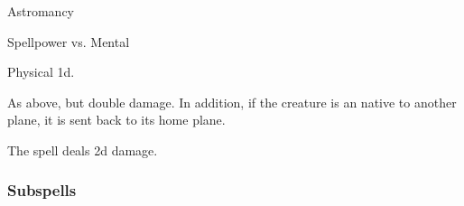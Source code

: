 \newpage
\begin{spellsection}{Astromancy}

\begin{spellheader}
\end{spellheader}

\begin{spellcontent}

\begin{spelltargetinginfo}




\end{spelltargetinginfo}


\begin{spelleffects}




\begin{spellattack}{Spellpower vs. Mental}


\spellsuccess Physical  \plus1d.


\spellcritical
As above, but double damage.
In addition, if the creature is an  native to another plane, it is sent back to its home plane.



\end{spellattack}





\end{spelleffects}

\end{spellcontent}
\begin{spellfooter}


\end{spellfooter}
\begin{spellsubcontent}


\begin{spellcantrip}
The spell deals \minus2d damage.
\end{spellcantrip}


\end{spellsubcontent}
\end{spellsection}


\subsubsection{Subspells}


